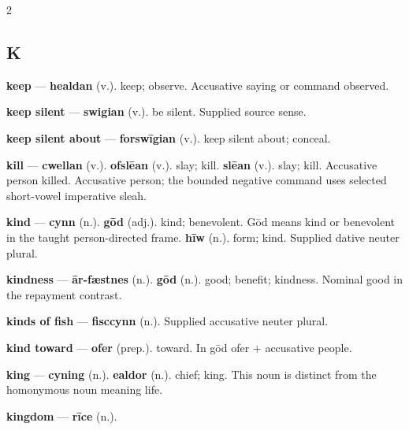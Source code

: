 \begin{multicols}{2}
\subsection*{K}
\textbf{keep} — \textbf{healdan} (v.). keep; observe. Accusative saying or command observed.\par
\textbf{keep silent} — \textbf{swigian} (v.). be silent. Supplied source sense.\par
\textbf{keep silent about} — \textbf{forswīgian} (v.). keep silent about; conceal.\par
\textbf{kill} — \textbf{cwellan} (v.).  \textbf{ofslēan} (v.). slay; kill. \textbf{slēan} (v.). slay; kill. Accusative person killed. Accusative person; the bounded negative command uses selected short-vowel imperative sleah.\par
\textbf{kind} — \textbf{cynn} (n.).  \textbf{gōd} (adj.). kind; benevolent. Gōd means kind or benevolent in the taught person-directed frame. \textbf{hīw} (n.). form; kind. Supplied dative neuter plural.\par
\textbf{kindness} — \textbf{ār-fæstnes} (n.).  \textbf{gōd} (n.). good; benefit; kindness. Nominal good in the repayment contrast.\par
\textbf{kinds of fish} — \textbf{fisccynn} (n.). Supplied accusative neuter plural.\par
\textbf{kind toward} — \textbf{ofer} (prep.). toward. In gōd ofer + accusative people.\par
\textbf{king} — \textbf{cyning} (n.).  \textbf{ealdor} (n.). chief; king. This noun is distinct from the homonymous noun meaning life.\par
\textbf{kingdom} — \textbf{rīce} (n.).\par

\end{multicols}
